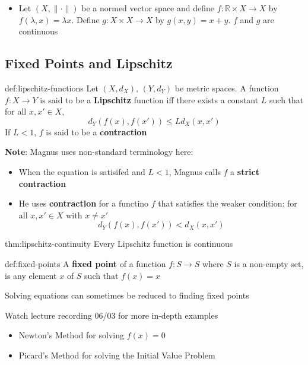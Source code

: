 \documentclass[landscape, 8pt]{extarticle}
\begin{document}
\begin{multicols}{3}
\begin{itemize}
    \item Let $(X, \lVert  \cdot \rVert)$ be a normed vector space and define $f: \mathbb{R} \times X \to X $ by $f(\lambda, x) = \lambda x$. Define $g: X \times X \to X $ by $g(x,y) = x + y$. $f$ and $g$ are continuous
\end{itemize}


\newpage

\subsection{Fixed Points and Lipschitz}

\begin{dfn}{def:lipschitz-functions}{}
    Let $(X, d_{X}),\,(Y, d_{Y})$ be metric spaces. A function $f : X \to Y$ is said to be a \textbf{Lipschitz} function iff there exists a constant $L$ such that for all $x,x'\in X$,
    \[d_{Y}(f(x), f(x')) \le L d_{X}(x,x')\]
    If $L < 1$, $f$ is said to be a \textbf{contraction}
\end{dfn}

\textbf{Note}: Magnus uses non-standard terminology here:
\begin{itemize}
    \item When the equation is satisifed and $L < 1$, Magnus calls $f$ a \textbf{strict contraction}
    \item He uses \textbf{contraction} for a functino $f$ that satisfies the weaker condition: for all $x, x' \in X$ with $x \ne x'$
        \[d_{Y}(f(x), f(x')) < d_{X}(x,x')\]
\end{itemize}

\begin{thm}{thm:lipschitz-continuity}{}
    Every Lipschitz function is continuous
\end{thm}

\begin{dfn}{def:fixed-points}{}
    A \textbf{fixed point} of a function $f: S \to S $ where $S$ is a non-empty set, is any element $x$ of $S$ such that $f(x) = x$

    Solving equations can sometimes be reduced to finding fixed points
\end{dfn}

Watch lecture recording 06/03 for more in-depth examples
\begin{itemize}
    \item Newton's Method for solving $f(x) = 0$
    \item Picard's Method for solving the Initial Value Problem
\end{itemize}


\end{multicols}
\end{document}

